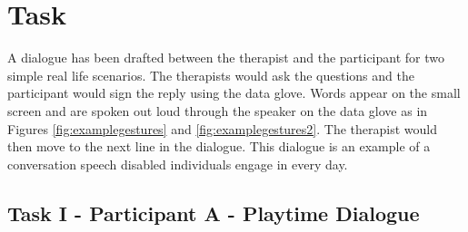 \section{Task}

A dialogue has been drafted between the therapist and the participant for two simple real life scenarios. The therapists would ask the questions and the participant would sign the reply using the data glove. Words appear on the small screen and are spoken out loud through the speaker on the data glove as in Figures \ref{fig:examplegestures} and \ref{fig:examplegestures2}. The therapist would then move to the next line in the dialogue. This dialogue is an example of a conversation speech disabled individuals engage in every day. 

\subsection{Task I - Participant A - Playtime Dialogue}

